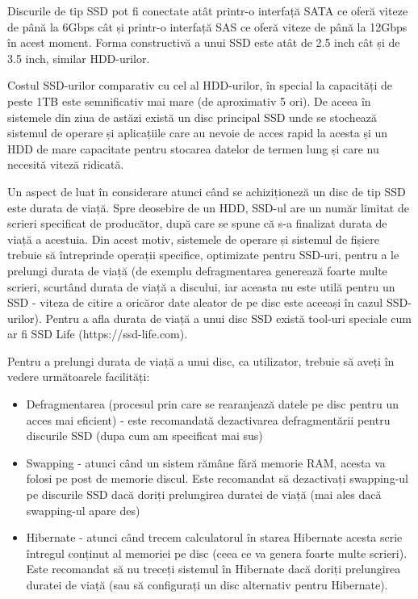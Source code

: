 Discurile de tip SSD pot fi conectate atât printr-o interfață SATA ce oferă
viteze de până la 6Gbps cât și printr-o interfață SAS ce oferă viteze de până la
12Gbps în acest moment. Forma constructivă a unui SSD este atât de 2.5 inch cât
și de 3.5 inch, similar HDD-urilor.

Costul SSD-urilor comparativ cu cel al HDD-urilor, în special la capacități de
peste 1TB este semnificativ mai mare (de aproximativ 5 ori). De aceea în
sistemele din ziua de astăzi există un disc principal SSD unde se stochează
sistemul de operare și aplicațiile care au nevoie de acces rapid la acesta și un
HDD de mare capacitate pentru stocarea datelor de termen lung și care nu
necesită viteză ridicată.

Un aspect de luat în considerare atunci când se achiziționeză un disc de tip SSD
este durata de viață. Spre deosebire de un HDD, SSD-ul are un număr limitat de
scrieri specificat de producător, după care se spune că s-a finalizat durata de
viață a acestuia. Din acest motiv, sistemele de operare și sistemul de fișiere
trebuie să întreprinde operații specifice, optimizate pentru SSD-uri, pentru a
le prelungi durata de viață (de exemplu defragmentarea generează foarte multe
scrieri, scurtând durata de viață a discului, iar aceasta nu este utilă pentru
un SSD - viteza de citire a oricăror date aleator de pe disc este aceeași în
cazul SSD-urilor). Pentru a afla durata de viață a unui disc SSD există tool-uri
speciale cum ar fi SSD Life (https://ssd-life.com).


Pentru a prelungi durata de viață a unui disc, ca utilizator, trebuie să aveți
în vedere următoarele facilități:

\begin{itemize}
	\item Defragmentarea (procesul prin care se rearanjează datele pe disc
		pentru un acces mai eficient) - este recomandată dezactivarea
		defragmentării pentru discurile SSD (dupa cum am specificat mai
		sus)
	\item Swapping - atunci când un sistem rămâne fără memorie RAM, acesta
		va folosi pe post de memorie discul. Este recomandat să
		dezactivați swapping-ul pe discurile SSD dacă doriți prelungirea
		duratei de viață (mai ales dacă swapping-ul apare des)
	\item Hibernate - atunci când trecem calculatorul în starea Hibernate
		acesta scrie întregul conținut al memoriei pe disc (ceea ce va
		genera foarte multe scrieri). Este recomandat să nu treceți
		sistemul în Hibernate dacă doriți prelungirea duratei de viață
		(sau să configurați un disc alternativ pentru Hibernate).
\end{itemize}

